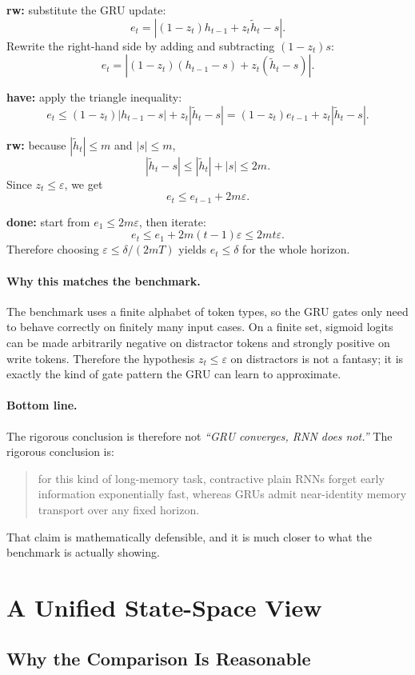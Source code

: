 \documentclass[12pt,a4paper]{article}
\begin{document}
\textbf{rw:} substitute the GRU update:
\[
e_t
=
\left|(1-z_t)h_{t-1} + z_t \tilde h_t - s\right|.
\]
Rewrite the right-hand side by adding and subtracting \((1-z_t)s\):
\[
e_t
=
\left|(1-z_t)(h_{t-1}-s) + z_t(\tilde h_t-s)\right|.
\]

\textbf{have:} apply the triangle inequality:
\[
e_t
\le
(1-z_t)|h_{t-1}-s| + z_t|\tilde h_t-s|
=
(1-z_t)e_{t-1} + z_t|\tilde h_t-s|.
\]

\textbf{rw:} because \(|\tilde h_t| \le m\) and \(|s| \le m\),
\[
|\tilde h_t-s| \le |\tilde h_t| + |s| \le 2m.
\]
Since \(z_t \le \varepsilon\), we get
\[
e_t \le e_{t-1} + 2m\varepsilon.
\]

\textbf{done:} start from \(e_1 \le 2m\varepsilon\), then iterate:
\[
e_t
\le
e_1 + 2m(t-1)\varepsilon
\le
2mt\varepsilon.
\]
Therefore choosing \(\varepsilon \le \delta/(2mT)\) yields \(e_t \le \delta\) for the whole horizon.

\paragraph{Why this matches the benchmark.}
The benchmark uses a finite alphabet of token types, so the GRU gates only need to behave correctly on finitely many input cases. On a finite set, sigmoid logits can be made arbitrarily negative on distractor tokens and strongly positive on write tokens. Therefore the hypothesis \(z_t \le \varepsilon\) on distractors is not a fantasy; it is exactly the kind of gate pattern the GRU can learn to approximate.

\paragraph{Bottom line.}
The rigorous conclusion is therefore not
\emph{``GRU converges, RNN does not.''}
The rigorous conclusion is:
\begin{quote}
for this kind of long-memory task, contractive plain RNNs forget early information exponentially fast, whereas GRUs admit near-identity memory transport over any fixed horizon.
\end{quote}
That claim is mathematically defensible, and it is much closer to what the benchmark is actually showing.

\section{A Unified State-Space View}

\subsection{Why the Comparison Is Reasonable}
\end{document}
